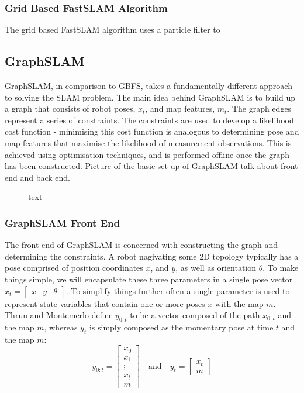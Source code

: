 \documentclass[a4paper]{article}
\begin{document}
\subsubsection{Grid Based FastSLAM Algorithm}
The grid based FastSLAM algorithm uses a particle filter to 


\subsection{GraphSLAM}
GraphSLAM, in comparison to GBFS, takes a fundamentally different approach to solving the SLAM problem. The main idea behind GraphSLAM is to build up a graph that consists of robot poses, $x_t$, and map features, $m_t$. The graph edges represent a series of constraints. The constraints are used to develop a likelihood cost function - minimising this cost function is analogous to determining pose and map features that maximise the likelihood of measurement observations. This is achieved using optimisation techniques, and is performed offline once the graph has been constructed. Picture of the basic set up of GraphSLAM talk about front end and back end.
\begin{figure}[h]
\centering
\caption{text}
\end{figure}


\subsubsection{GraphSLAM Front End}
The front end of GraphSLAM is concerned with constructing the graph and determining the constraints. A robot nagivating some 2D topology typically has a pose comprised of position coordinates $x$, and $y$, as well as orientation $\theta$. To make things simple, we will encapsulate these three parameters in a single pose vector $x_t = \begin{bmatrix} x & y & \theta \end{bmatrix}$. To simplify things further often a single parameter is used to represent state variables that contain one or more poses $x$ with the map $m$. Thrun and Montemerlo define $y_{0:t}$ to be a vector composed of the path $x_{0:t}$ and the map $m$, whereas $y_t$ is simply composed as the momentary pose at time $t$ and the map $m$:
\begin{equation}
y_{0:t} =
\begin{bmatrix}
x_0 \\ x_1 \\ \vdots \\ x_t \\ m
\end{bmatrix}
\quad\mathrm{and}\quad 
y_t =
\begin{bmatrix}
x_t \\ m
\end{bmatrix}
\end{equation}
\end{document}
